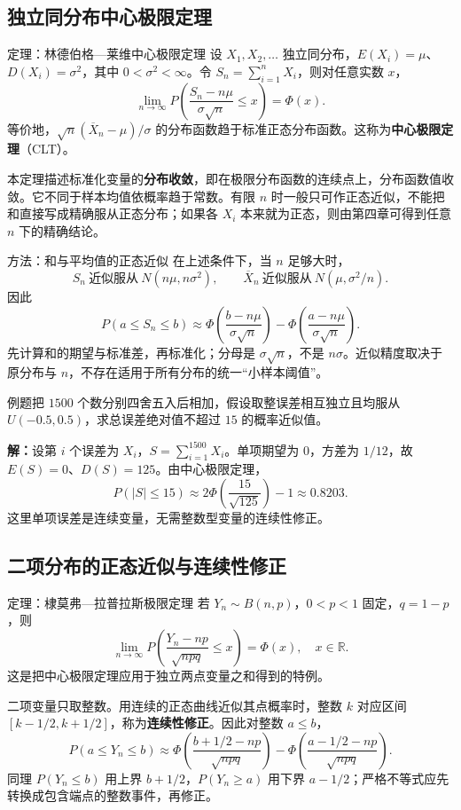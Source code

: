 \documentclass[UTF8,fontset=none,zihao=-4,a4paper]{ctexart}
\newcommand{\term}[1]{\textbf{#1}}
\newcommand{\example}[1]{\begin{infobox}{例题}#1\end{infobox}}
\newcommand{\solution}{\par\noindent\textbf{解：}}
\begin{document}
\subsection{独立同分布中心极限定理}
\begin{infobox}{定理：林德伯格—莱维中心极限定理}
设 $X_1,X_2,\ldots$ 独立同分布，$E(X_i)=\mu$、$D(X_i)=\sigma^2$，其中 $0<\sigma^2<\infty$。令 $S_n=\sum_{i=1}^nX_i$，则对任意实数 $x$，
\[
\lim_{n\to\infty}P\left(\frac{S_n-n\mu}{\sigma\sqrt n}\le x\right)=\Phi(x).
\]
等价地，$\sqrt n(\overline X_n-\mu)/\sigma$ 的分布函数趋于标准正态分布函数。这称为\term{中心极限定理}（CLT）。
\end{infobox}
本定理描述标准化变量的\term{分布收敛}，即在极限分布函数的连续点上，分布函数值收敛。它不同于样本均值依概率趋于常数。有限 $n$ 时一般只可作正态近似，不能把和直接写成精确服从正态分布；如果各 $X_i$ 本来就为正态，则由第四章可得到任意 $n$ 下的精确结论。
\begin{infobox}{方法：和与平均值的正态近似}
在上述条件下，当 $n$ 足够大时，
\[
S_n\ \text{近似服从}\ N(n\mu,n\sigma^2),\qquad
\overline X_n\ \text{近似服从}\ N(\mu,\sigma^2/n).
\]
因此
\[
P(a\le S_n\le b)\approx
\Phi\left(\frac{b-n\mu}{\sigma\sqrt n}\right)
-\Phi\left(\frac{a-n\mu}{\sigma\sqrt n}\right).
\]
先计算和的期望与标准差，再标准化；分母是 $\sigma\sqrt n$，不是 $n\sigma$。近似精度取决于原分布与 $n$，不存在适用于所有分布的统一“小样本阈值”。
\end{infobox}
\example{把 $1500$ 个数分别四舍五入后相加，假设取整误差相互独立且均服从 $U(-0.5,0.5)$，求总误差绝对值不超过 $15$ 的概率近似值。}
\solution 设第 $i$ 个误差为 $X_i$，$S=\sum_{i=1}^{1500}X_i$。单项期望为 $0$，方差为 $1/12$，故 $E(S)=0$、$D(S)=125$。由中心极限定理，
\[
P(|S|\le15)\approx
2\Phi\left(\frac{15}{\sqrt{125}}\right)-1
\approx0.8203.
\]
这里单项误差是连续变量，无需整数型变量的连续性修正。

\subsection{二项分布的正态近似与连续性修正}
\begin{infobox}{定理：棣莫弗—拉普拉斯极限定理}
若 $Y_n\sim B(n,p)$，$0<p<1$ 固定，$q=1-p$，则
\[
\lim_{n\to\infty}P\left(\frac{Y_n-np}{\sqrt{npq}}\le x\right)=\Phi(x),
\quad x\in\mathbb R.
\]
这是把中心极限定理应用于独立两点变量之和得到的特例。
\end{infobox}
二项变量只取整数。用连续的正态曲线近似其点概率时，整数 $k$ 对应区间 $[k-1/2,k+1/2]$，称为\term{连续性修正}。因此对整数 $a\le b$，
\[
P(a\le Y_n\le b)\approx
\Phi\left(\frac{b+1/2-np}{\sqrt{npq}}\right)
-\Phi\left(\frac{a-1/2-np}{\sqrt{npq}}\right).
\]
同理 $P(Y_n\le b)$ 用上界 $b+1/2$，$P(Y_n\ge a)$ 用下界 $a-1/2$；严格不等式应先转换成包含端点的整数事件，再修正。
\end{document}
